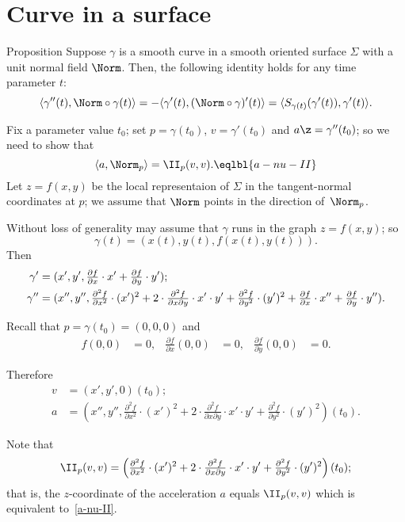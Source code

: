 \section*{Curve in a surface}


\begin{thm}{Proposition}\label{prop:gamma''=II}
Suppose $\gamma$ is a smooth curve in a smooth oriented surface $\Sigma$ with a unit normal field $\Norm$.
Then, the following identity holds for any time parameter $t$:
\[\langle \gamma''(t),\Norm\circ\gamma(t)\rangle=-\langle \gamma'(t),(\Norm\circ\gamma)'(t)\rangle=\langle S_{\gamma(t)}(\gamma'(t)),\gamma'(t)\rangle.\]

\end{thm}

Fix a parameter value $t_0$; set $p=\gamma(t_0)$, $v=\gamma'(t_0)$ and $a\z=\gamma''(t_0)$;
so we need to show that
\[\langle a,\Norm_{p}\rangle=\II_p(v,v).\eqlbl{a-nu-II}\]
Let $z=f(x,y)$ be the local representaion of $\Sigma$ in the tangent-normal coordinates at $p$;
we assume that $\Norm$ points in the direction of~$\Norm_p$.

Without loss of generality may assume that $\gamma$ runs in the graph $z=f(x,y)$;
so 
\[\gamma(t)=\left(x(t),y(t),f(x(t),y(t))\right).\]
Then
\begin{align*}
\gamma'&=(x',y',\tfrac{\partial f}{\partial x}\cdot x'+\tfrac{\partial f}{\partial y}\cdot y');
\\
\gamma''
&=
{\small(x'',
y'',
 \tfrac{\partial^2 f}{\partial x^2}\cdot (x')^2
+
2\cdot \tfrac{\partial^2 f}{\partial x\partial y}\cdot x'\cdot y'
+
\tfrac{\partial^2 f}{\partial y^2}\cdot (y')^2
+
\tfrac{\partial f}{\partial x}\cdot x''
+
\tfrac{\partial f}{\partial y}\cdot y'')}.
\end{align*}

Recall that $p=\gamma(t_0)=(0,0,0)$ and
\begin{align*}
f(0,0)&=0,
&
\tfrac{\partial f}{\partial x}(0,0)&=0,
&
\tfrac{\partial f}{\partial y}(0,0)&=0.
\end{align*}

Therefore 
\begin{align*}
v&=\left(x',y',0\right)(t_0);
\\
a&=\left(x'',y'',
\tfrac{\partial^2 f}{\partial x^2}\cdot (x')^2
+
2\cdot \tfrac{\partial^2 f}{\partial x\partial y}\cdot x'\cdot y'
+
\tfrac{\partial^2 f}{\partial y^2}\cdot (y')^2\right)(t_0).
\end{align*}

Note that 
\[\II_p(v,v)=\left(\tfrac{\partial^2 f}{\partial x^2}\cdot (x')^2
+
2\cdot \tfrac{\partial^2 f}{\partial x\partial y}\cdot x'\cdot y'
+
\tfrac{\partial^2 f}{\partial y^2}\cdot (y')^2\right)(t_0);\]
that is, the $z$-coordinate of the acceleration $a$ equals $\II_p(v,v)$ which is equivalent to~\ref{a-nu-II}.
\qeds



















